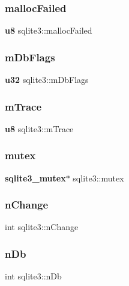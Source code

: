 \mbox{\label{structsqlite3_a79beb0036337ba7fc2de5ccbb9225935}} 
\subsubsection{mallocFailed}
{\footnotesize\ttfamily \textbf{ u8} sqlite3\+::malloc\+Failed}

\mbox{\label{structsqlite3_a5440eb1d35a5b351f58afc31964c96a6}} 
\subsubsection{mDbFlags}
{\footnotesize\ttfamily \textbf{ u32} sqlite3\+::m\+Db\+Flags}

\mbox{\label{structsqlite3_a2eff859ef583decb4bc75ff34f632570}} 
\subsubsection{mTrace}
{\footnotesize\ttfamily \textbf{ u8} sqlite3\+::m\+Trace}

\mbox{\label{structsqlite3_a6328497ac0393204ab5f5083f05731c9}} 
\subsubsection{mutex}
{\footnotesize\ttfamily \textbf{ sqlite3\+\_\+mutex}$\ast$ sqlite3\+::mutex}

\mbox{\label{structsqlite3_aaafd4eaa11ae4ea51d84ed4564a8d372}} 
\subsubsection{nChange}
{\footnotesize\ttfamily int sqlite3\+::n\+Change}

\mbox{\label{structsqlite3_a03d047bc289999b0e39d8637f0762489}} 
\subsubsection{nDb}
{\footnotesize\ttfamily int sqlite3\+::n\+Db}


